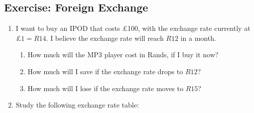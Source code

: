             \subsection{Exercise: Foreign Exchange }
            \nopagebreak
            \label{m39335*id68624}\begin{enumerate}[noitemsep, label=\textbf{\arabic*}. ] 
            \label{m39335*uid21}\item I want to buy an IPOD that costs £100, with the exchange rate currently at
$£1=R14$. I believe the exchange rate will reach \begin{math}R12\end{math} in a month.
\label{m39335*id68677}\begin{enumerate}[noitemsep, label=\textbf{\alph*}. ] 
            \label{m39335*uid22}\item How much will the MP3 player cost in Rands, if I buy it now?
\label{m39335*uid23}\item How much will I save if the exchange rate drops to $R12$?
\label{m39335*uid24}\item How much will I lose if the exchange rate moves to $R15$?
\end{enumerate}
        \label{m39335*uid25}\item Study the following exchange rate table:
    \setlength\mytablespace{6\tabcolsep}
    \addtolength\mytablespace{4\arrayrulewidth}
    \setlength\mytablewidth{\linewidth}
    \setlength\mytableroom{\mytablewidth}
    \addtolength\mytableroom{-\mytablespace}
    \setlength\myfixedwidth{0pt}
    \setlength\mystarwidth{\mytableroom}
        \addtolength\mystarwidth{-\myfixedwidth}
        \divide{}
\end{enumerate}
